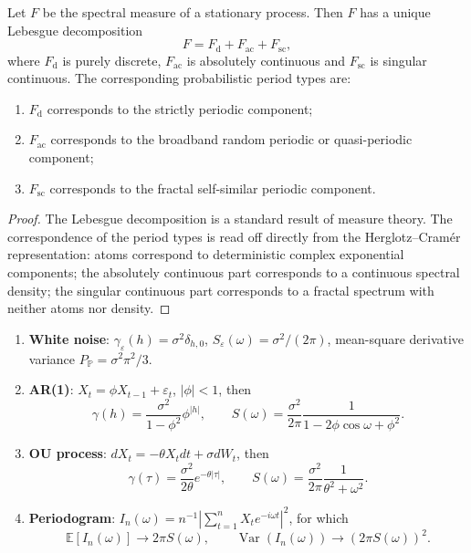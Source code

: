 \begin{lemma}\label{lem:spectral_lebesgue_decomposition}
Let $F$ be the spectral measure of a stationary process. Then $F$ has a unique Lebesgue decomposition
\[
F=F_{\mathrm{d}}+F_{\mathrm{ac}}+F_{\mathrm{sc}},
\]
where $F_{\mathrm d}$ is purely discrete, $F_{\mathrm{ac}}$ is absolutely continuous and $F_{\mathrm{sc}}$ is singular continuous. The corresponding probabilistic period types are:
\begin{enumerate}[label=(\roman*)]
    \item $F_{\mathrm d}$ corresponds to the strictly periodic component;
    \item $F_{\mathrm{ac}}$ corresponds to the broadband random periodic or quasi-periodic component;
    \item $F_{\mathrm{sc}}$ corresponds to the fractal self-similar periodic component.
\end{enumerate}
\end{lemma}

\begin{proof}
The Lebesgue decomposition is a standard result of measure theory. The correspondence of the period types is read off directly from the Herglotz--Cramér representation: atoms correspond to deterministic complex exponential components; the absolutely continuous part corresponds to a continuous spectral density; the singular continuous part corresponds to a fractal spectrum with neither atoms nor density.
\end{proof}

\begin{proposition}\label{prop:typical_prob_spectra}
\begin{enumerate}[label=(\roman*)]
    \item \textbf{White noise}: $\gamma_\varepsilon(h)=\sigma^2\delta_{h,0}$, $S_\varepsilon(\omega)=\sigma^2/(2\pi)$, mean-square derivative variance $P_{\mathbb P}=\sigma^2\pi^2/3$.
    \item \textbf{AR(1)}: $X_t=\phi X_{t-1}+\varepsilon_t$, $|\phi|<1$, then
    \[
    \gamma(h)=\frac{\sigma^2}{1-\phi^2}\phi^{|h|},\qquad
    S(\omega)=\frac{\sigma^2}{2\pi}\frac{1}{1-2\phi\cos\omega+\phi^2}.
    \]
    \item \textbf{OU process}: $dX_t=-\theta X_tdt+\sigma dW_t$, then
    \[
    \gamma(\tau)=\frac{\sigma^2}{2\theta}e^{-\theta|\tau|},\qquad
    S(\omega)=\frac{\sigma^2}{2\pi}\frac{1}{\theta^2+\omega^2}.
    \]
    \item \textbf{Periodogram}: $I_n(\omega)=n^{-1}|\sum_{t=1}^nX_t e^{-i\omega t}|^2$, for which
    \[
    \mathbb E[I_n(\omega)]\to 2\pi S(\omega),\qquad
    \operatorname{Var}(I_n(\omega))\to (2\pi S(\omega))^2.
    \]
\end{enumerate}
\end{proposition}

